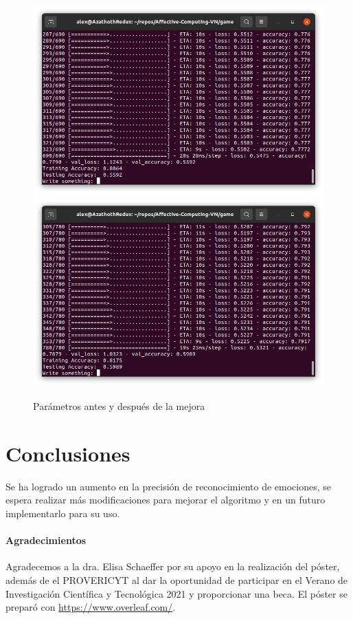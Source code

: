 \documentclass[a4]{sciposter}
\begin{document}
\begin{multicols}{2}
\begin{figure}
	\captionsetup{type=figure}
	\setcounter{figure}{2}
	\includegraphics[scale=0.6]{img/Test 2021-05.png}
	\includegraphics[scale=0.6]{img/Test 2021-07.png}
	\caption{Parámetros antes y después de la mejora}
\end{figure}

\section{Conclusiones}

Se ha logrado un aumento en la precisión de reconocimiento de emociones, se espera realizar más modificaciones para mejorar el algoritmo y en un futuro implementarlo para su uso.

\paragraph{Agradecimientos}

{\small Agradecemos a la dra. Elisa Schaeffer por su apoyo en la realización del póster, además de el PROVERICYT al dar la oportunidad de participar en el Verano de Investigación Científica y Tecnológica 2021 y proporcionar una beca.
El póster se preparó con \url{https://www.overleaf.com/}.}





\end{multicols}
\end{document}
